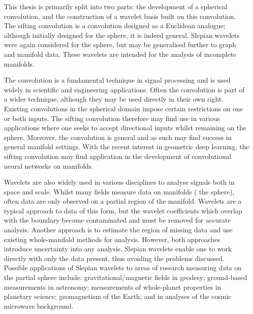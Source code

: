 \begin{impactstatement} %
	This thesis is primarily split into two parts: the development of a spherical convolution, and the construction of a wavelet basis built on this convolution.
	The sifting convolution is a convolution designed as a Euclidean analogue; although initially designed for the sphere, it is indeed general.
	Slepian wavelets were again considered for the sphere, but may be generalised further to graph and manifold data.
	These wavelets are intended for the analysis of incomplete manifolds.

	The convolution is a fundamental technique in signal processing and is used widely in scientific and engineering applications.
	Often the convolution is part of a wider technique, although they may be used directly in their own right.
	Existing convolutions in the spherical domain impose certain restrictions on one or both inputs.
	The sifting convolution therefore may find use in various applications where one seeks to accept directional inputs whilst remaining on the sphere.
	Moreover, the convolution is general and as such may find success in general manifold settings.
	With the recent interest in geometric deep learning, the sifting convolution may find application in the development of convolutional neural networks on manifolds.

	Wavelets are also widely used in various disciplines to analyse signals both in space and scale.
	Whilst many fields measure data on manifolds (\ie{} the sphere), often data are only observed on a partial region of the manifold.
	Wavelets are a typical approach to data of this form, but the wavelet coefficients which overlap with the boundary become contaminated and must be removed for accurate analysis.
	Another approach is to estimate the region of missing data and use existing whole-manifold methods for analysis.
	However, both approaches introduce uncertainty into any analysis.
	Slepian wavelets enable one to work directly with only the data present, thus avoiding the problems discussed.
	Possible applications of Slepian wavelets to areas of research measuring data on the partial sphere include: gravitational/magnetic fields in geodesy; ground-based measurements in astronomy; measurements of whole-planet properties in planetary science; geomagnetism of the Earth; and in analyses of the cosmic microwave background.
\end{impactstatement}

